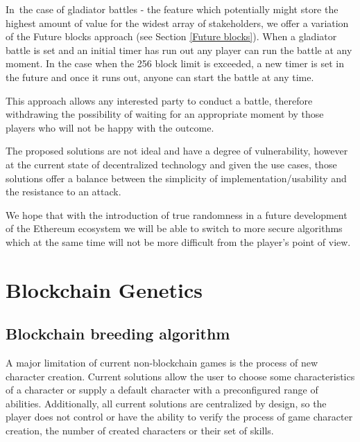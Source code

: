 \documentclass[12pt]{article}
\begin{document}
In\ the case of gladiator battles - the feature which potentially might store the highest amount of value for the widest array of stakeholders, we offer a variation of the Future blocks approach (see Section  \ref{Future blocks}). When a gladiator battle is set and an initial timer has run out any player can run the battle at any moment. In the case when the 256 block limit is exceeded, a new timer is set in the future and once it runs out, anyone can start the battle at any time.\par

This approach allows any interested party to conduct a battle, therefore withdrawing the possibility of waiting for an appropriate moment by those players who will not be happy with the outcome.\par


\vspace{\baselineskip}
The proposed solutions are not ideal and have a degree of vulnerability, however at the current state of decentralized technology and given the use cases, those solutions offer a balance between the simplicity of implementation/usability and the resistance to an attack.\par

We hope that with the introduction of true randomness in a future development of the Ethereum ecosystem we will be able to switch to more secure algorithms which at the same time will not be more difficult from the player’s point of view.\par

\newpage
\vspace{\baselineskip}\section{Blockchain Genetics}
\label{Blockchain Genetics}   \par

\subsection{Blockchain breeding algorithm}
  \label{Blockchain breeding algorithm}  \par

A major limitation of current non-blockchain games is the process of new character creation. Current solutions allow the user to choose some characteristics of a character or supply a default character with a preconfigured range of abilities. Additionally, all current solutions are centralized by design, so the player does not control or have the ability to verify the process of game character creation, the number of created characters or their set of skills.\par
\end{document}
